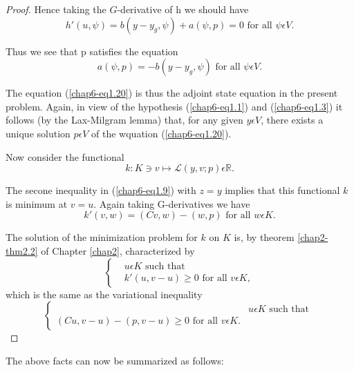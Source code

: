 \begin{proof}
Hence taking the $G$-derivative of h we should have
$$
h' (u, \psi) = b(y - y_{g}, \psi) + a(\psi, p) = 0 \text{ for all } \psi \epsilon V.
$$

Thus we see that p satisfies the equation
\begin{equation*}
a(\psi, p) = -b(y - y_{g}, \psi) \text{ for all } \psi \epsilon V.\tag{1.20}\label{chap6-eq1.20}
\end{equation*}

The equation (\ref{chap6-eq1.20}) is thus the adjoint state equation
in the present problem. Again, in view of the hypothesis
(\ref{chap6-eq1.1}) and (\ref{chap6-eq1.3}) it follows (by the
Lax-Milgram lemma) that, for any given $y \epsilon V$, there exists a
unique solution $p \epsilon V$ of the wquation\pageoriginale
(\ref{chap6-eq1.20}). 

Now consider the functional
$$
k : K \ni v \mapsto \mathscr{L}(y, v ; p) \epsilon \mathbb{R}.
$$

The secone inequality in (\ref{chap6-eq1.9}) with $z = y$ implies that
this functional $k$ is minimum at $v = u$. Again taking G-derivatives we
have 
$$
k'(v, w) = (Cv, w) - (w, p) \text{ for all } w \epsilon K.
$$

The solution of the minimization problem for $k$ on $K$ is, by theorem
\ref{chap2-thm2.2} of Chapter \ref{chap2}, characterized by 
\begin{equation*}
\begin{cases}
& u \epsilon K \text{ such that }\\
& k'(u, v - u) \geq 0 \text{ for all } v \epsilon K,
\end{cases}
\end{equation*}
which is the same as the variational inequality
\begin{equation*}
\begin{cases}
& u \epsilon K \text{ such that }\\
(Cu, v-u) - (p, v-u) \geq 0 \text{ for all } v \epsilon K.\tag{1.21}\label{chap6-eq1.21}
\end{cases}
\end{equation*}
\end{proof}

The above facts can now be summarized as follows:

